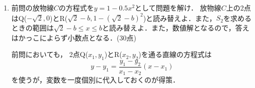 \documentclass[12pt,a4j]{jarticle}
\begin{document}
\begin{enumerate}
$C$と直線$m$で囲まれた図形の面積$S_1$は
\begin{equation*}
S_1 = \frac{\fbox{ タチ }}{\fbox{ ツ }}\,b^3 + b^2-  \fbox{ テ }\,b+\frac{4}{3}
\end{equation*}
である．一方，$C$と直線$m$の$1-b \leqq x \leqq b$
の部分，および直線$x=b$で囲まれた図形の面積$S_2$は
\begin{equation*}
S_2 = \frac{\fbox{ ト }}{\fbox{ ナ }}\,b^3 + 2b^2-  
 \frac{\fbox{ ニ }}{\fbox{ ヌ }}\,b+\frac{2}{3}
\end{equation*}
である．よって，$S_1$と$S_2$の和$S$は
\begin{equation*}
S= S_1 + S_2 = 
\frac{\fbox{ ネ }}{\fbox{ ノ }}\,b^3 + 3b^2
- \frac{\fbox{ ハ }}{\fbox{ ヒ }}\,b+2
\end{equation*}
となる．

$\frac{1}{2} < b \leqq 1$のとき，$S$の増減を調べると，
$S$は$b=\sqrt{\fbox{ フ }} - \fbox{ ヘ }$で
最小値を取ることがわかる
(10点)

(2015年度大学入試センター試験　追試　数学II・B第2問(2))

\item 前問の放物線$C$の方程式を$y=1-0.5x^2$として問題を解け．
放物線$C$上の2点はQ($-\sqrt{2},0$)とR($\sqrt{2}-b,1-(\sqrt{2}-b)^2$)と読み替えよ．また，$S_2$を求めるときの範囲は$\sqrt{2}-b \leq x \leq b$と読み替えよ．また，数値解となるので，答えはかっこによらず小数点となる．(30点)

前問においても，
2点Q($x_1,y_1$)とR($x_2,y_2$)を通る直線の方程式は
$$
y-y_1 = \frac{y_1-y_2}{x_1-x_2}(x-x_1)
$$
を使うが，変数を一度個別に代入しておくのが得策．
\end{enumerate}
\end{document}

